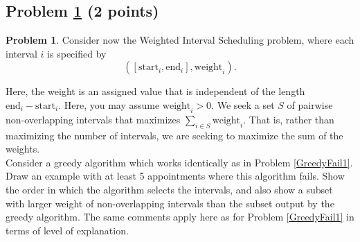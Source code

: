 \documentclass[11pt]{article}
\theoremstyle{definition}
\theoremstyle{definition}
\newtheorem{required}{Problem}
\theoremstyle{definition}
\begin{document}
\subsection{Problem \ref{GreedyFail3} (2 points)}
\begin{required} \label{GreedyFail3}
Consider now the \textsf{Weighted Interval Scheduling} problem, where each interval $i$ is specified by 
\[
([\text{start}_{i}, \text{end}_{i}], \text{weight}_{i}). 
\]

\noindent Here, the weight is an assigned value that is independent of the length $\text{end}_{i} - \text{start}_{i}$. Here, you may assume $\text{weight}_{i} > 0$. We seek a set $S$ of pairwise non-overlapping intervals that maximizes $\sum_{i \in S} \text{weight}_{i}$. That is, rather than maximizing the number of intervals, we are seeking to maximize the sum of the weights. \\

\noindent Consider a greedy algorithm which works identically as in Problem \ref{GreedyFail1}. Draw an example with at least 5 appointments where this algorithm fails. Show the order in which the algorithm selects the intervals, and also show a subset with larger weight of non-overlapping intervals than the subset output by the greedy algorithm. The same comments apply here as for Problem \ref{GreedyFail1} in terms of level of explanation.
\end{required}
\end{document}
